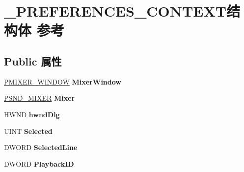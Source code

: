 \hypertarget{struct___p_r_e_f_e_r_e_n_c_e_s___c_o_n_t_e_x_t}{}\section{\+\_\+\+P\+R\+E\+F\+E\+R\+E\+N\+C\+E\+S\+\_\+\+C\+O\+N\+T\+E\+X\+T结构体 参考}
\label{struct___p_r_e_f_e_r_e_n_c_e_s___c_o_n_t_e_x_t}
\subsection*{Public 属性}
\begin{DoxyCompactItemize}
\item 
\mbox{\label{struct___p_r_e_f_e_r_e_n_c_e_s___c_o_n_t_e_x_t_af86739ad7b1edd38ce9b196d9bb2fc24}} 
\hyperlink{struct___m_i_x_e_r___w_i_n_d_o_w}{P\+M\+I\+X\+E\+R\+\_\+\+W\+I\+N\+D\+OW} {\bfseries Mixer\+Window}
\item 
\mbox{\label{struct___p_r_e_f_e_r_e_n_c_e_s___c_o_n_t_e_x_t_a7874e105818d9fb55cd788818d8a70a3}} 
\hyperlink{struct___s_n_d___m_i_x_e_r}{P\+S\+N\+D\+\_\+\+M\+I\+X\+ER} {\bfseries Mixer}
\item 
\mbox{\label{struct___p_r_e_f_e_r_e_n_c_e_s___c_o_n_t_e_x_t_ab86473b0b8f9966d3cb95fa554164563}} 
\hyperlink{interfacevoid}{H\+W\+ND} {\bfseries hwnd\+Dlg}
\item 
\mbox{\label{struct___p_r_e_f_e_r_e_n_c_e_s___c_o_n_t_e_x_t_a07f3419939d8b4eb3e6293f8729d2284}} 
U\+I\+NT {\bfseries Selected}
\item 
\mbox{\label{struct___p_r_e_f_e_r_e_n_c_e_s___c_o_n_t_e_x_t_a3299193988f7db7a5a3850785a9a2e86}} 
D\+W\+O\+RD {\bfseries Selected\+Line}
\item 
\mbox{\label{struct___p_r_e_f_e_r_e_n_c_e_s___c_o_n_t_e_x_t_a0fb01032e79071b51d0f0e5781c2f983}} 
D\+W\+O\+RD {\bfseries Playback\+ID}
\item 
\mbox{\label{struct___p_r_e_f_e_r_e_n_c_e_s___c_o_n_t_e_x_t_a7c633c42e64c2cde393f4eec97299ca0}} 

\end{DoxyCompactItemize}
